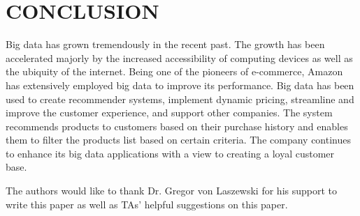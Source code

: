 \documentclass[sigconf]{acmart}
\begin{document}
\section{CONCLUSION}
Big data has grown tremendously in the recent past. The growth has been accelerated majorly by the increased accessibility of computing devices as well as the ubiquity of the internet. Being one of the pioneers 
of e-commerce, Amazon has extensively employed big data to improve its performance. Big data has been used to create recommender systems, implement dynamic pricing, streamline and improve the customer experience, 
and support other companies. The system recommends products to customers based on their purchase history and enables them to filter the products list based on certain criteria. The company continues to enhance its 
big data applications with a view to creating a loyal customer base. 

\begin{acks}

The authors would like to thank Dr. Gregor von Laszewski for his support to write this paper as well as TAs' helpful suggestions on this paper. 

\end{acks}


 
\end{document}
